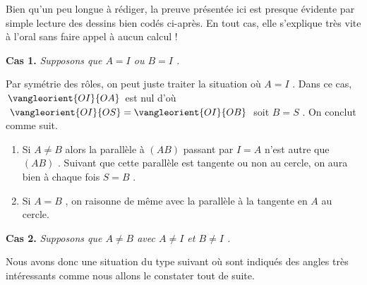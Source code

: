 Bien qu'un peu longue à rédiger, la preuve présentée ici est presque évidente par simple lecture des dessins bien codés ci-après. En tout cas, elle s'explique très vite à l'oral sans faire appel à aucun calcul !


\bigskip


\textbf{Cas 1.} \emph{Supposons que $A = I$ ou $B = I$ .}

\medskip

Par symétrie des rôles, on peut juste traiter la situation où $A = I$ . Dans ce cas, $\vangleorient{OI}{OA}$ est nul d'où $\vangleorient{OI}{OS} = \vangleorient{OI}{OB}$ soit $B = S$ . On conclut comme suit.

\begin{enumerate}
	\item Si $A \neq B$ alors la parallèle à $(AB)$ passant par $I = A$ n'est autre que $(AB)$ .
	Suivant que cette parallèle est tangente ou non au cercle, on aura bien à chaque fois $S = B$ .

	\item Si $A = B$ , on raisonne de même avec la parallèle à la tangente en $A$ au cercle.
\end{enumerate}




\bigskip


\textbf{Cas 2.} \emph{Supposons que $A \neq B$ avec $A \neq I$ et $B \neq I$ .}

\medskip

Nous avons donc une situation du type suivant où sont indiqués des angles très intéressants comme nous allons le constater tout de suite.

\smallskip
\begin{center}
\end{center}
\smallskip

